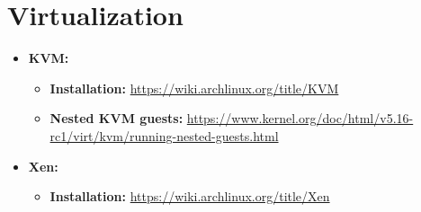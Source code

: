 \documentclass[10pt, a4paper, onecolumn, oneside, titlepage, openany]{book}
\begin{document}
\section{Virtualization}
\begin{itemize}
    \item \textbf{KVM:}
    \begin{itemize}
        \item \textbf{Installation:} \url{https://wiki.archlinux.org/title/KVM}
        \item \textbf{Nested KVM guests:} \url{https://www.kernel.org/doc/html/v5.16-rc1/virt/kvm/running-nested-guests.html}
    \end{itemize}
    \item \textbf{Xen:}
    \begin{itemize}
        \item \textbf{Installation:} \url{https://wiki.archlinux.org/title/Xen}
    \end{itemize}
\end{itemize}
\end{document}
